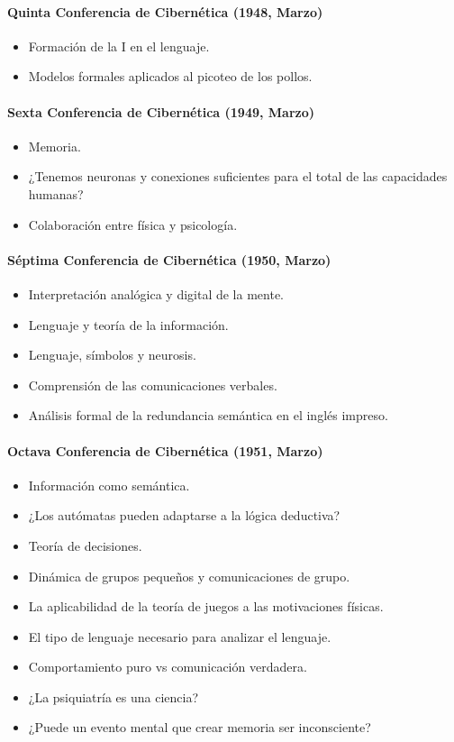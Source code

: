 	\paragraph{Quinta Conferencia de Cibernética (1948, Marzo)}
	\begin{itemize}
		\item Formación de la I en el lenguaje.
		\item Modelos formales aplicados al picoteo de los pollos.
	\end{itemize}
	\paragraph{Sexta Conferencia de Cibernética (1949, Marzo)}
	\begin{itemize}
		\item Memoria.
		\item ¿Tenemos neuronas y conexiones suficientes para el total de las capacidades humanas?
		\item Colaboración entre física y psicología.
	\end{itemize}
	\paragraph{Séptima Conferencia de Cibernética (1950, Marzo)}
	\begin{itemize}
		\item Interpretación analógica y digital de la mente.
		\item Lenguaje y teoría de la información.
		\item Lenguaje, símbolos y neurosis.
		\item Comprensión de las comunicaciones verbales.
		\item Análisis formal de la redundancia semántica en el inglés impreso.
	\end{itemize}
	\paragraph{Octava Conferencia de Cibernética (1951, Marzo)}
	\begin{itemize}
		\item Información como semántica.
		\item ¿Los autómatas pueden adaptarse a la lógica deductiva?
		\item Teoría de decisiones.
		\item Dinámica de grupos pequeños y comunicaciones de grupo.
		\item La aplicabilidad de la teoría de juegos a las motivaciones físicas.
		\item El tipo de lenguaje necesario para analizar el lenguaje.
		\item Comportamiento puro vs comunicación verdadera.
		\item ¿La psiquiatría es una ciencia?
		\item ¿Puede un evento mental que crear memoria ser inconsciente?
	\end{itemize}
